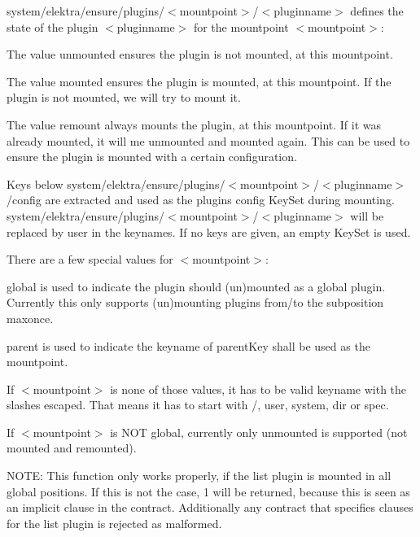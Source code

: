 \begin{DoxyItemize}
\item {\ttfamily system/elektra/ensure/plugins/$<$mountpoint$>$/$<$pluginname$>$} defines the state of the plugin {\ttfamily $<$pluginname$>$} for the mountpoint {\ttfamily $<$mountpoint$>$}\+:
\begin{DoxyItemize}
\item The value {\ttfamily unmounted} ensures the plugin is not mounted, at this mountpoint.
\item The value {\ttfamily mounted} ensures the plugin is mounted, at this mountpoint. If the plugin is not mounted, we will try to mount it.
\item The value {\ttfamily remount} always mounts the plugin, at this mountpoint. If it was already mounted, it will me unmounted and mounted again. This can be used to ensure the plugin is mounted with a certain configuration.
\end{DoxyItemize}
\item Keys below {\ttfamily system/elektra/ensure/plugins/$<$mountpoint$>$/$<$pluginname$>$/config} are extracted and used as the plugins config Key\+Set during mounting. {\ttfamily system/elektra/ensure/plugins/$<$mountpoint$>$/$<$pluginname$>$} will be replaced by {\ttfamily user} in the keynames. If no keys are given, an empty Key\+Set is used.
\end{DoxyItemize}

There are a few special values for {\ttfamily $<$mountpoint$>$}\+:
\begin{DoxyItemize}
\item {\ttfamily global} is used to indicate the plugin should (un)mounted as a global plugin. Currently this only supports (un)mounting plugins from/to the subposition {\ttfamily maxonce}.
\item {\ttfamily parent} is used to indicate the keyname of {\ttfamily parent\+Key} shall be used as the mountpoint.
\end{DoxyItemize}

If {\ttfamily $<$mountpoint$>$} is none of those values, it has to be valid keyname with the slashes escaped. That means it has to start with {\ttfamily /}, {\ttfamily user}, {\ttfamily system}, {\ttfamily dir} or {\ttfamily spec}.

If {\ttfamily $<$mountpoint$>$} is N\+OT {\ttfamily global}, currently only {\ttfamily unmounted} is supported (not {\ttfamily mounted} and {\ttfamily remounted}).

N\+O\+TE\+: This function only works properly, if the list plugin is mounted in all global positions. If this is not the case, 1 will be returned, because this is seen as an implicit clause in the contract. Additionally any contract that specifies clauses for the list plugin is rejected as malformed.


